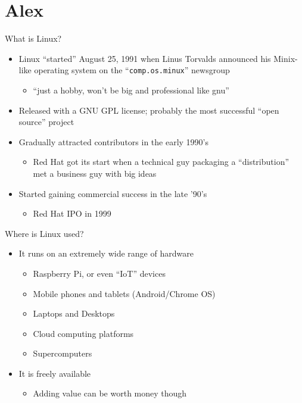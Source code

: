 \documentclass[aspectratio=169, notes]{beamer}
\begin{document}
\section{Alex}

\begin{frame}{What is Linux?}
	\pause
	\begin{itemize}
	\item Linux ``started'' August 25, 1991 when Linus Torvalds announced his Minix-like operating system on the ``\texttt{comp.os.minux}'' newsgroup
		\begin{itemize}
		\item ``just a hobby, won't be big and professional like gnu''
		\end{itemize}
	\item Released with a GNU GPL license; probably the most successful ``open source'' project
	\item Gradually attracted contributors in the early 1990's
		\begin{itemize}
		\item Red Hat got its start when a technical guy packaging a ``distribution'' met a business guy with big ideas
		\end{itemize}
	\item Started gaining commercial success in the late '90's
		\begin{itemize}
		\item Red Hat IPO in 1999
		\end{itemize}
	\end{itemize}
\end{frame}

\begin{frame}{Where is Linux used?}
	\begin{itemize}
	\item It runs on an extremely wide range of hardware
		\begin{itemize}
		\item Raspberry Pi, or even ``IoT'' devices
		\item Mobile phones and tablets (Android/Chrome OS)
		\item Laptops and Desktops
		\item Cloud computing platforms
		\item Supercomputers
		\end{itemize}
	\item It is freely available
		\begin{itemize}
		\item Adding value can be worth money though
		\end{itemize}
	\end{itemize}
\end{frame}
\end{document}
